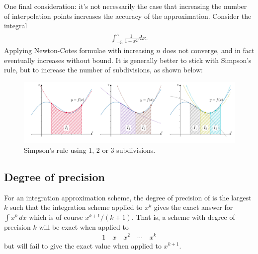 One final consideration: it's not necessarily the case that increasing the number of interpolation points increases the accuracy of the approximation. Consider the integral
\begin{align*}
\int_{-5}^5 \frac{1}{1+x^2} dx.
\end{align*}
Applying Newton-Cotes formulae with increasing $n$ does not converge, and in fact eventually increases without bound. It is generally better to stick with Simpson's rule, but to increase the number of subdivisions, as shown below:
\begin{figure}[H]
	\begin{center}
	\includegraphics[width=\textwidth]{figures/ch5_simpsons_refinement.pdf} 
	  \caption{Simpson's rule using 1, 2 or 3 subdivisions.} \label{fig:ch5_simpsons_refinement}
	\end{center}
\end{figure}



\subsection{Degree of precision}

For an integration approximation scheme, the degree of precision of is the largest $k$ such that the integration scheme applied to $x^k$ gives the exact answer for $\int x^k \, dx$ which is of course $x^{k+1}/(k+1)$. That is, a scheme with degree of precision $k$ will be exact when applied to
\begin{align*}
1 \quad x \quad x^2 \quad \cdots \quad x^k
\end{align*}
but will fail to give the exact value when applied to $x^{k+1}$.

